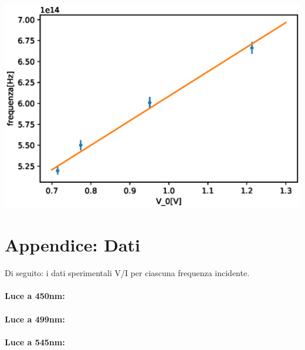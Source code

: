 \documentclass[10pt,a4paper]{article}
\begin{document}
\begin{minipage}{.6\linewidth}
		\centering
		\includegraphics[width=\linewidth]{immagini/fit1.eps}
		\label{fig:fit1}
	\end{minipage}
	\begin{minipage}{.4\linewidth}
		
		\label{tab:fit1}
\end{minipage}\newline\newline

\section*{Appendice: Dati}
\noindent
Di seguito: i dati sperimentali V/I per ciascuna frequenza incidente.\\
\paragraph{Luce a 450nm:\hspace{2.5cm}}


\paragraph{Luce a 499nm:\hspace{2.5cm}}


\paragraph{Luce a 545nm:\hspace{2.5cm}}

\end{document}
